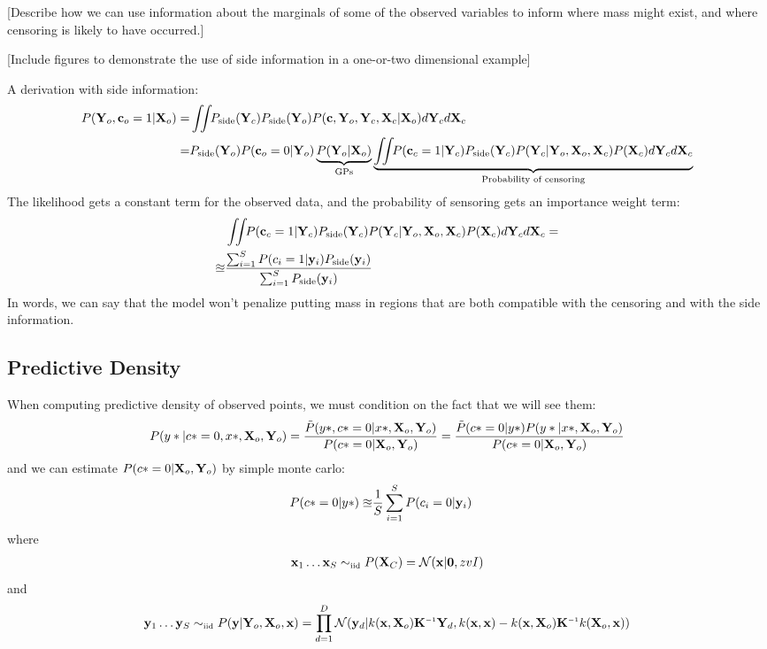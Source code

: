 \documentclass{article}
\begin{document}
[Describe how we can use information about the marginals of some of the observed variables to inform where mass might exist, and where censoring is likely to have occurred.]

[Include figures to demonstrate the use of side information in a one-or-two dimensional example]

A derivation with side information:
%
\begin{align}
P(\vY_o, \vc_o = 1 | \vX_o) = & \intlatent P_{\textrm{side}}(\vY_c) P_{\textrm{side}}(\vY_o) P( \vc, \vY_o, \vY_c, \vX_c | \vX_o ) d\vY_c d\vX_c \\
= & P_{\textrm{side}}(\vY_o) P( \vc_o = 0 | \vY_o ) \underbrace{P( \vY_o | \vX_o )}_{\textrm{GPs}} \underbrace{\intlatent P( \vc_c = 1 | \vY_c ) P_{\textrm{side}}(\vY_c) P( \vY_c | \vY_o, \vX_o, \vX_c) P(\vX_c) d\vY_c d\vX_c }_{\textrm{Probability of censoring}}
\label{eqn:full_censoring_likelihood}
\end{align}
%
The likelihood gets a constant term for the observed data, and the probability of sensoring gets an importance weight term:
%
\begin{align}
& \int \!\!\! \int \!\! P( {\bf{c}}_c = 1 | \mathbf{Y}_c )  P_{\textrm{side}}(\mathbf{Y}_c) P( \mathbf{Y}_c | \mathbf{Y}_o, \mathbf{X}_o, \mathbf{X}_c) P(\mathbf{X}_c) d\mathbf{Y}_c d\mathbf{X}_c = \\
\approxeq & \frac{ \sum_{i=1}^S P(c_i = 1 | {\bf{y}}_i ) P_{\textrm{side}}({\bf{y}}_i) }{  \sum_{i=1}^S P_{\textrm{side}}({\bf{y}}_i)}
\label{eqn:approx-prob-censoring}
\end{align}
%
In words, we can say that the model won't penalize putting mass in regions that are both compatible with the censoring and with the side information.

\subsection{Predictive Density}

When computing predictive density of observed points, we must condition on the fact that we will see them:
%
\begin{align}
P(y* |c* = 0, x*, \mathbf{X}_o, \mathbf{Y}_o ) = \frac{\tilde{P}(y*, c* = 0 | x*, \mathbf{X}_o, \mathbf{Y}_o )}{ P(c* = 0 | \mathbf{X}_o, \mathbf{Y}_o)}
= \frac{\tilde{P}(c* = 0 | y* ) P(y* | x*, \mathbf{X}_o, \mathbf{Y}_o )}{ P(c* = 0 | \mathbf{X}_o, \mathbf{Y}_o)}
\end{align}
%
and we can estimate $P(c* = 0 | \mathbf{X}_o, \mathbf{Y}_o )$ by simple monte carlo:
%
\begin{align}
P(c* = 0 | y* ) \approxeq & \frac{1}{S} \sum_{i=1}^S P(c_i = 0 | {\bf{y}}_i )
\end{align}
%
where
%
\begin{align}
  \vx_1 \dots \vx_S \simiid P( \vX_C ) = \N{\vx}{ \vzero}{ zvI }
\end{align}
%
and
%
\begin{align}
 \vy_1 \dots \vy_S \simiid P(\vy | \vY_o, \vX_o, \vx) = \prod_{d=1}^D \N{\vy_d}{k(\vx, \vX_o) \vK\inv \vY_d}{k(\vx, \vx) - k(\vx, \vX_o) \vK\inv k(\vX_o, \vx)}
\end{align}
\end{document}
